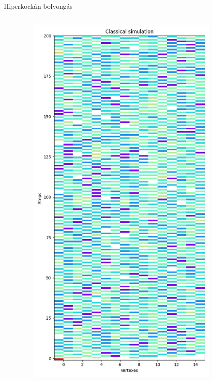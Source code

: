 \documentclass[aspectratio=169]{beamer}
\begin{document}
\begin{frame}{Hiperkockán bolyongás}

  \begin{columns}[onlytextwidth]
    \begin{column}{.25\textwidth}
    \end{column}
    \begin{column}{.25\textwidth}
      \begin{figure}
        \includegraphics[width=0.9\textwidth]{./tdk_figures/results/hypercube/classical.jpg}

\end{figure}
\end{column}
\end{columns}
\end{frame}
\end{document}
